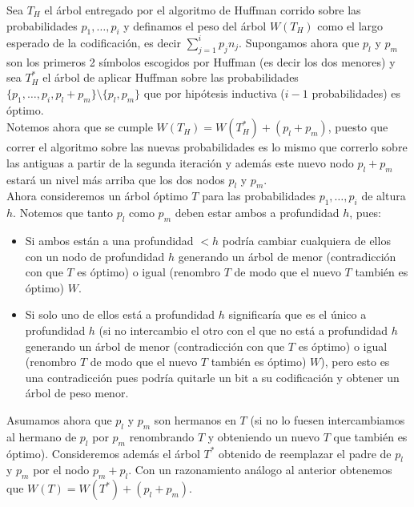 \documentclass[dcc,uchile]{fcfmcourse}
\theoremstyle{plain}
\theoremstyle{definition}
\begin{document}
\begin{problems}
\begin{enumerate}[a)]
    Sea $T_{H}$ el árbol entregado por el algoritmo de Huffman corrido sobre las probabilidades $p_{1},\ldots,p_{i}$ y definamos el peso del árbol $W(T_{H})$ como el largo esperado de la codificación, es decir $\sum_{j=1}^i p_{j}n_{j}$. Supongamos ahora que $p_{l}$ y $p_{m}$ son los primeros 2 símbolos escogidos por Huffman (es decir los dos menores) y sea $T_{H}^*$ el árbol de aplicar Huffman sobre las probabilidades $\{p_{1},\ldots,p_{i}, p_{l}+p_{m}\}\setminus\{p_{l}, p_{m}\}$ que por hipótesis inductiva ($i-1$ probabilidades) es óptimo.\\
    
    Notemos ahora que se cumple $W(T_{H}) = W(T_{H}^*) + (p_{l}+p_{m})$, puesto que correr el algoritmo sobre las nuevas probabilidades es lo mismo que correrlo sobre las antiguas a partir de la segunda iteración y además este nuevo nodo $p_{l}+p_{m}$ estará un nivel más arriba que los dos nodos $p_{l}$ y $p_{m}$.\\
    
    Ahora consideremos un árbol óptimo $T$ para las probabilidades  $p_{1},\ldots,p_{i}$ de altura $h$. Notemos que tanto $p_{l}$ como $p_{m}$ deben estar ambos a profundidad $h$, pues:
    \begin{itemize}
        \item Si ambos están a una profundidad $<h$ podría cambiar cualquiera de ellos con un nodo de profundidad $h$ generando un árbol de menor (contradicción con que $T$ es óptimo) o igual (renombro $T$ de modo que el nuevo $T$ también es óptimo) $W$.
        \item Si solo uno de ellos está a profundidad $h$ significaría que es el único a profundidad $h$ (si no intercambio el otro con el que no está a profundidad $h$ generando un árbol de menor (contradicción con que $T$ es óptimo) o igual (renombro $T$ de modo que el nuevo $T$ también es óptimo) $W$), pero esto es una contradicción pues podría quitarle un bit a su codificación y obtener un árbol de peso menor.
    \end{itemize}
    
    Asumamos ahora que $p_{l}$ y $p_{m}$ son hermanos en $T$ (si no lo fuesen intercambiamos al hermano de $p_{l}$ por $p_{m}$ renombrando $T$ y obteniendo un nuevo $T$ que también es óptimo). Consideremos además el árbol $T^*$ obtenido de reemplazar el padre de $p_{l}$ y $p_{m}$ por el nodo $p_{m}+p_{l}$. Con un razonamiento análogo al anterior obtenemos que $W(T) = W(T^*) + (p_{l}+p_{m})$.\\
    

\end{enumerate}
\end{problems}
\end{document}
